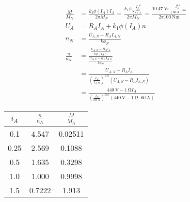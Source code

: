 \documentclass[11pt,a4paper]{scrartcl}
\newcommand{\mybr}[1]{\left(#1\right)}
\newcommand{\0}{_{\mybr{0}}}
\newcommand{\1}{_{\mybr{1}}}
\newcommand{\2}{_{\mybr{2}}}
\begin{document}
\subsection{}
\begin{align}
\frac{M}{M_N}&=\frac{k_1\phi\mybr{I_A}I_A}{2\pi M_N}=\frac{k_1\phi_N\frac{I_A^{\num{1.6}}}{I_{A,N}^{\num{0.6}}}}{2\pi M_N}=\frac{\SI{10.47}{\volt\second}\frac{I_A^{\num{1.6}}}{\mybr{\SI{60}{\ampere}}^{\num{0.6}}}}{2\pi\SI{100}{\newton\metre}}\\
U_A&=R_A I_A + k_1 \phi\mybr{I_A} n\\
n_N&=\frac{U_{A,N}-R_A I_{A,N}}{k\phi_N}\\
\frac{n}{n_N}&=\frac{\frac{U_{A,N}-R_A I_A}{k\phi\mybr{I_A}}}{\frac{U_{A,N}-R_A I_{A,N}}{k\phi_N}}\\
&=\frac{U_{A,N}-R_A I_A}{\mybr{\frac{I_A}{I_{A,N}}}^{\num{0.6}}\mybr{U_{A,N}-R_A I_{A,N}}}\\
&=\frac{\SI{440}{\volt}-\SI{1}{\ohm}I_A}{\mybr{\frac{I_A}{\SI{60}{\ampere}}}^{\num{0.6}}\mybr{\SI{440}{\volt}-\SI{1}{\ohm}\cdot\SI{60}{\ampere}}}
\end{align}
\begin{table}[!htbp]
	\begin{center}
	\begin{tabular}{SSS}
		\toprule
		{$i_A$} & {$\frac{n}{n_N}$} & {$\frac{M}{M_N}$} \\
		 & 4.547 & 0.02511 \\
		0.25 & 2.569 & 0.1088 \\
		0.5 & 1.635 & 0.3298 \\
		1.0 & 1.000 & 0.9998 \\
		1.5 & 0.7222 & 1.913 \\
		\bottomrule
	\end{tabular}
	\end{center}
\end{table}
\begin{figure*}[!htbp]
\centering
{}
\end{figure*}
\end{document}
